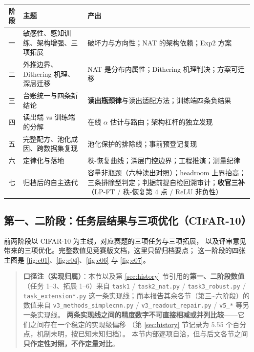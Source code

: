 \documentclass[11pt,a4paper]{ctexart}
\begin{document}
\begin{center}
\small
\begin{tabular}{clp{8.4cm}}
\toprule
阶段 & 主题 & 产出 \\
\midrule
一 & 敏感性、感知训练、架构增强、三项拓展 & 破坏力与方向性；NAT 的架构依赖；Exp2 方案 \\
二 & 外推边界、Dithering 机理、深层迁移 & NAT 是分布内属性；Dithering 机理判决；方案可迁移 \\
三 & 台账统一与四条新结论 & \textbf{读出瓶颈律}与读出适配方法；训练端四条负结果 \\
四 & 读出端 vs 训练端的分解 & 在线 $\alpha$ 估计与路由；架构杠杆的独立发现 \\
五 & 完整配方、池化成因、跨数据集复现 & 池化保护的排除线；事前预登记复现 \\
六 & 定律化与落地 & 秩-恢复曲线；深层门控边界；工程推演；测量纪律 \\
七 & 归档后的自主迭代 & 容量非瓶颈（六种读出对照）；headroom 上界抬高；三条排除型判定；判据前提自检回溯审计；\textbf{收官三补}（LP-FT / 秩-恢复第 4 点 / ReLU 非负性） \\
\bottomrule
\end{tabular}
\end{center}

\subsection{第一、二阶段：任务层结果与三项优化（CIFAR-10）}

前两阶段以 CIFAR-10 为主线，对应赛题的三项任务与三项拓展，
以及评审意见带来的三项优化。完整数值见竞赛版文档，这里只留归档要点；
这一阶段的四张主图是 \cref{fig:c01}、\cref{fig:c04}、\cref{fig:c06} 与 \cref{fig:c07}。

\begin{quote}
\small\textbf{口径注（实现归属）}：本节以及第 \ref{sec:history} 节引用的\textbf{第一、二阶段数值}
（任务 1--3、拓展 1--6）来自 \texttt{task1} / \texttt{task2\_nat.py} / \texttt{task3\_robust.py} /
\texttt{task\_extension*.py} 这一条实现线；而本报告其余各节（第三\textasciitilde 六阶段）的数值来自
\texttt{v3\_methods\_simplecnn.py} / \texttt{v3\_readout\_repair.py} / \texttt{v5\_*} 等另一条实现线。
\textbf{两条实现线之间的精度数字不可直接相减或并列比较}——它们之间存在一个稳定的实现级偏移
（第 \ref{sec:history} 节记录为 5.55 个百分点，机制未明，按已知未知归档）。
本节内部逐项自洽，但与后文各节之间\textbf{只作定性对照，不作定量对比}。
\end{quote}
\end{document}
